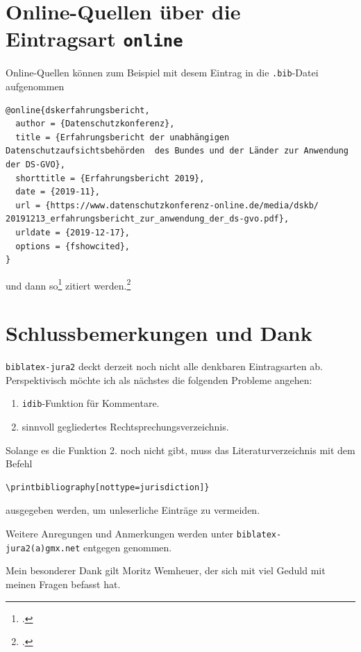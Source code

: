 \documentclass[headings=small,numbers=noenddot, 12pt,oneside]{scrartcl}
\begin{document}
\section{Online-Quellen über die Eintragsart \texttt{online}}
Online-Quellen können zum Beispiel mit desem Eintrag in die \texttt{.bib}-Datei aufgenommen
\begin{verbatim}
@online{dskerfahrungsbericht,
  author = {Datenschutzkonferenz},
  title = {Erfahrungsbericht der unabhängigen Datenschutzaufsichtsbehörden  des Bundes und der Länder zur Anwendung der DS-GVO},
  shorttitle = {Erfahrungsbericht 2019},
  date = {2019-11},
  url = {https://www.datenschutzkonferenz-online.de/media/dskb/ 20191213_erfahrungsbericht_zur_anwendung_der_ds-gvo.pdf},
  urldate = {2019-12-17},
  options = {fshowcited},
}
\end{verbatim}
und dann so\footcite[9]{dskerfahrungsbericht} zitiert werden.\footcite[25]{dskerfahrungsbericht}


\section{Schlussbemerkungen und Dank}
\texttt{biblatex-jura2} deckt derzeit noch nicht alle denkbaren Eintragsarten ab. Perspektivisch möchte ich als nächstes die folgenden Probleme angehen:
\begin{enumerate}
    \item \texttt{idib}-Funktion für Kommentare.
    \item sinnvoll gegliedertes Rechtsprechungsverzeichnis.
\end{enumerate}
Solange es die Funktion 2. noch nicht gibt, muss  das Literaturverzeichnis mit dem Befehl
\begin{verbatim}
\printbibliography[nottype=jurisdiction]}
\end{verbatim} 
ausgegeben werden, um unleserliche Einträge zu vermeiden.

Weitere Anregungen und Anmerkungen werden unter \texttt{biblatex-jura2(a)gmx.net} entgegen genommen.

Mein besonderer Dank gilt Moritz Wemheuer, der sich mit viel Geduld mit meinen Fragen befasst hat.

\newpage
\sloppy
{}
\printbibliography[nottype=jurisdiction]
\fussy

\end{document}
